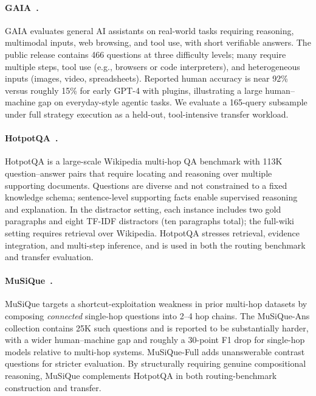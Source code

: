 \paragraph{GAIA~\citep{mialon2023gaia}.}
GAIA evaluates general AI assistants on real-world tasks requiring reasoning, multimodal inputs,
web browsing, and tool use, with short verifiable answers.
The public release contains 466 questions at three difficulty levels; many require multiple steps,
tool use (e.g., browsers or code interpreters), and heterogeneous inputs (images, video,
spreadsheets).
Reported human accuracy is near 92\% versus roughly 15\% for early GPT-4 with plugins, illustrating
a large human--machine gap on everyday-style agentic tasks.
We evaluate a 165-query subsample under full strategy execution as a held-out, tool-intensive
transfer workload.

\paragraph{HotpotQA~\citep{yang2018hotpotqa}.}
HotpotQA is a large-scale Wikipedia multi-hop QA benchmark with 113K question--answer pairs that
require locating and reasoning over multiple supporting documents.
Questions are diverse and not constrained to a fixed knowledge schema; sentence-level supporting
facts enable supervised reasoning and explanation.
In the distractor setting, each instance includes two gold paragraphs and eight TF-IDF distractors
(ten paragraphs total); the full-wiki setting requires retrieval over Wikipedia.
HotpotQA stresses retrieval, evidence integration, and multi-step inference, and is used in both
the routing benchmark and transfer evaluation.

\paragraph{MuSiQue~\citep{trivedi2022musique}.}
MuSiQue targets a shortcut-exploitation weakness in prior multi-hop datasets by composing
\emph{connected} single-hop questions into 2--4 hop chains.
The MuSiQue-Ans collection contains 25K such questions and is reported to be substantially harder,
with a wider human--machine gap and roughly a 30-point F1 drop for single-hop models relative to
multi-hop systems.
MuSiQue-Full adds unanswerable contrast questions for stricter evaluation.
By structurally requiring genuine compositional reasoning, MuSiQue complements HotpotQA in both
routing-benchmark construction and transfer.

